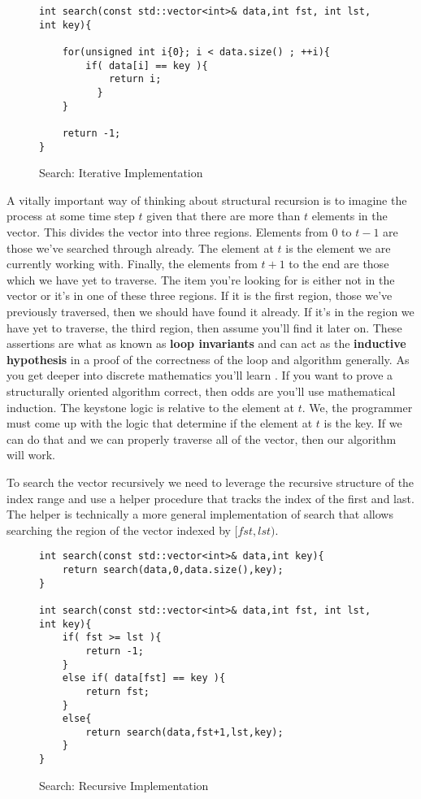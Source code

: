 \documentclass[nobib]{tufte-handout}
\begin{document}
\begin{figure}[htpb!]
\begin{lstlisting}
int search(const std::vector<int>& data,int fst, int lst, int key){

    for(unsigned int i{0}; i < data.size() ; ++i){
    	if( data[i] == key ){
			return i;
		  }
    }

    return -1;
}
\end{lstlisting}
\label{code:searchiter}
\caption{Search: Iterative Implementation}
\end{figure}

A vitally important way of thinking about structural recursion is to imagine the process at some time step $t$ given that there are more than $t$ elements in the vector. This divides the vector into three regions. Elements from $0$ to $t-1$ are those we've searched through already.  The element at $t$ is the element we are currently working with. Finally, the elements from $t+1$ to the end are those which we have yet to traverse. The item you're looking for is either not in the vector or it's in one of these three regions. If it is the first region, those we've previously traversed, then we should have found it already.  If it's in the region we have yet to traverse, the third region, then assume you'll find it later on.  These assertions are what as known as \textbf{loop invariants} and can act as the \textbf{inductive hypothesis} in a proof of the correctness of the loop and algorithm generally. As you get deeper into discrete mathematics you'll learn . If you want to prove a structurally oriented algorithm correct, then odds are you'll use mathematical induction. The keystone logic is relative to the element at $t$. We, the programmer must come up with the logic that determine if the element at $t$ is the key. If we can do that and we can properly traverse all of the vector, then our algorithm will work.

To search the vector recursively we need to leverage the recursive structure of the index range and use a helper procedure that tracks the index of the first and last. The helper is technically a more general implementation of search that allows searching the region of the vector indexed by $[fst,lst)$. %

\begin{figure}[htpb!]
\begin{lstlisting}
int search(const std::vector<int>& data,int key){
	return search(data,0,data.size(),key);
}

int search(const std::vector<int>& data,int fst, int lst, int key){
	if( fst >= lst ){
		return -1;
	}
	else if( data[fst] == key ){
		return fst;
	}
	else{
		return search(data,fst+1,lst,key);
	}
}
\end{lstlisting}
\label{code:searchrec}
\caption{Search: Recursive Implementation}
\end{figure}
\end{document}
